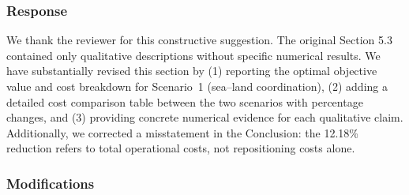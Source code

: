 \documentclass[11pt,a4paper]{article}
\begin{document}
\subsubsection{Response}
We thank the reviewer for this constructive suggestion. The original Section 5.3 contained only qualitative descriptions without specific numerical results. We have substantially revised this section by (1) reporting the optimal objective value and cost breakdown for Scenario~1 (sea–land coordination), (2) adding a detailed cost comparison table between the two scenarios with percentage changes, and (3) providing concrete numerical evidence for each qualitative claim. Additionally, we corrected a misstatement in the Conclusion: the 12.18\% reduction refers to total operational costs, not repositioning costs alone.

\subsubsection{Modifications}
\end{document}
